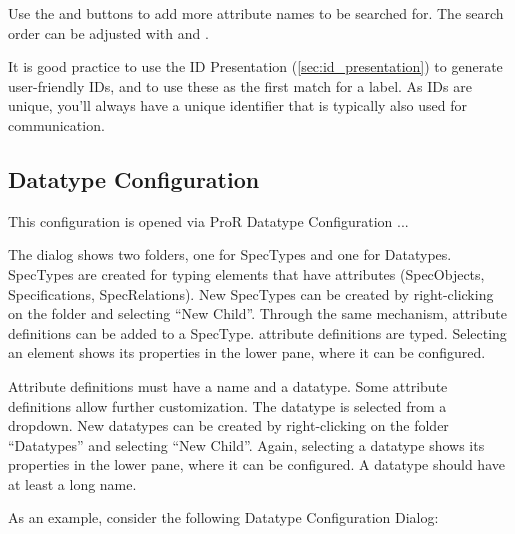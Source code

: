Use the  and  buttons to add more attribute names to be searched for.  The
search order can be adjusted with  and .

\begin{info}
It is good practice to use the ID Presentation (\ref{sec:id_presentation}) to generate
user-friendly IDs, and to use these as the first match for a label.  As IDs are unique, you'll always
have a unique identifier that is typically also used for communication.
\end{info}

\subsection{Datatype Configuration}
\label{sec:datatype_configuration}

This configuration is opened via ProR \textbar{} Datatype Configuration
...

The dialog shows two folders, one for SpecTypes and one for Datatypes.
SpecTypes are created for typing elements that have attributes
(SpecObjects, Specifications, SpecRelations).  New SpecTypes can be
created by right-clicking on the folder and selecting ``New Child''.
Through the same mechanism, attribute definitions can be added to a
SpecType.  attribute definitions are typed.  Selecting an element shows
its properties in the lower pane, where it can be configured.

Attribute definitions must have a name and a datatype.  Some attribute
definitions allow further customization.  The datatype is selected from a
dropdown.  New datatypes can be created by right-clicking on the folder
``Datatypes'' and selecting ``New Child''.  Again, selecting a datatype
shows its properties in the lower pane, where it can be configured.  A
datatype should have at least a long name.

As an example, consider the following Datatype Configuration Dialog:

